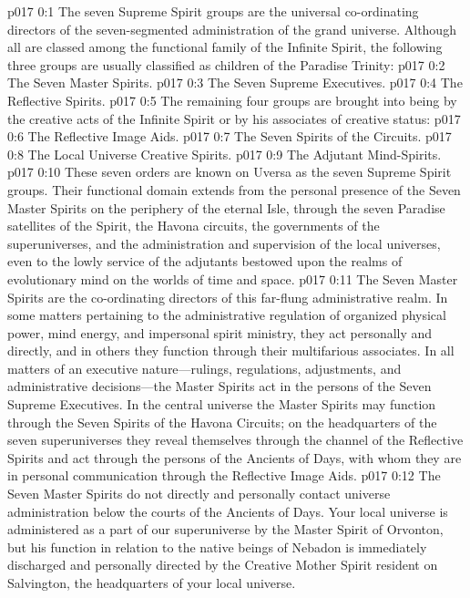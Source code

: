 \author{Divine Counselor}
\vs p017 0:1 The seven Supreme Spirit groups are the universal co\hyp{}ordinating directors of the seven\hyp{}segmented administration of the grand universe. Although all are classed among the functional family of the Infinite Spirit, the following three groups are usually classified as children of the Paradise Trinity:
\pc \vs p017 0:2 \bibnobreakspace The Seven Master Spirits.
\vs p017 0:3 \bibnobreakspace The Seven Supreme Executives.
\vs p017 0:4 \bibnobreakspace The Reflective Spirits.
\pc \vs p017 0:5 The remaining four groups are brought into being by the creative acts of the Infinite Spirit or by his associates of creative status:
\vs p017 0:6 \bibnobreakspace The Reflective Image Aids.
\vs p017 0:7 \bibnobreakspace The Seven Spirits of the Circuits.
\vs p017 0:8 \bibnobreakspace The Local Universe Creative Spirits.
\vs p017 0:9 \bibnobreakspace The Adjutant Mind\hyp{}Spirits.
\pc \vs p017 0:10 These seven orders are known on Uversa as the seven Supreme Spirit groups. Their functional domain extends from the personal presence of the Seven Master Spirits on the periphery of the eternal Isle, through the seven Paradise satellites of the Spirit, the Havona circuits, the governments of the superuniverses, and the administration and supervision of the local universes, even to the lowly service of the adjutants bestowed upon the realms of evolutionary mind on the worlds of time and space.
\vs p017 0:11 The Seven Master Spirits are the co\hyp{}ordinating directors of this far\hyp{}flung administrative realm. In some matters pertaining to the administrative regulation of organized physical power, mind energy, and impersonal spirit ministry, they act personally and directly, and in others they function through their multifarious associates. In all matters of an executive nature---rulings, regulations, adjustments, and administrative decisions---the Master Spirits act in the persons of the Seven Supreme Executives. In the central universe the Master Spirits may function through the Seven Spirits of the Havona Circuits; on the headquarters of the seven superuniverses they reveal themselves through the channel of the Reflective Spirits and act through the persons of the Ancients of Days, with whom they are in personal communication through the Reflective Image Aids.
\vs p017 0:12 The Seven Master Spirits do not directly and personally contact universe administration below the courts of the Ancients of Days. Your local universe is administered as a part of our superuniverse by the Master Spirit of Orvonton, but his function in relation to the native beings of Nebadon is immediately discharged and personally directed by the Creative Mother Spirit resident on Salvington, the headquarters of your local universe.
